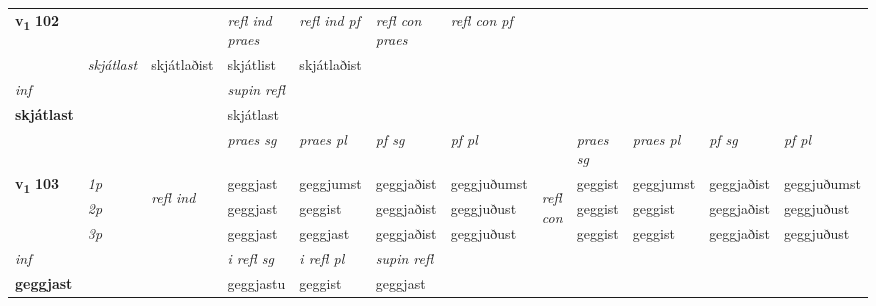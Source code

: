 \begin{longtable}[l]{X>{\footnotesize\itshape}llXXXXlXXXX}
\midrule

\multirow{2}{*}{{{\textbf{v{\textsubscript{1}}} \Large{\textbf{102}}}}}  & &&\textit{refl ind praes} & \textit{refl ind pf} & \textit{refl con praes} & \textit{refl con pf} \\*
\multicolumn{3}{r}{\textit{e-m}}& skjátlast & skjátlaðist & skjátlist & skjátlaðist \\*

\cmidrule{4-7}
   {\textit{inf}} & &       & \textit{supin refl}  \\*
  {\textbf{skjátlast}} & &       & skjátlast  \\*

\midrule

 & &   & \textit{praes sg}  & \textit{praes pl}    & \textit{ pf sg} & \textit{pf pl} & & \textit{praes sg}  & \textit{praes pl}    & \textit{pf sg} & \textit{pf pl }  \\ \cmidrule{4-7} \cmidrule{9-12}
 \multirow{2}{*}{{{\textbf{v{\textsubscript{1}}} \Large{\textbf{103}}}}}  & 1p & \multirow{3}{*}{\begin{turn}{90}\textit{refl ind}\end{turn}}  & geggjast & geggjumst & geggjaðist & geggjuðumst & \multirow{3}{*}{\begin{turn}{90}\textit{refl con}\end{turn}}  &geggist & geggjumst & geggjaðist & geggjuðumst \\*
 & 2p &  & geggjast & geggist & geggjaðist & geggjuðust & &geggist & geggist & geggjaðist & geggjuðust \\*
 & 3p  & & geggjast & geggjast & geggjaðist & geggjuðust & & geggist & geggist& geggjaðist & geggjuðust \\*
\cmidrule{4-7} \cmidrule{9-12}

   {\textit{inf}} & &   & \textit{i refl sg} & \textit{i refl pl}   & \textit{supin refl}  \\*
  {\textbf{geggjast}} & &   & geggjastu & geggist   & geggjast  \\*

\midrule


\end{longtable}
